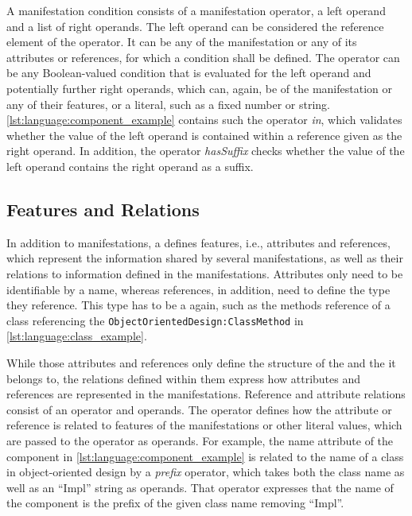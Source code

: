 A manifestation condition consists of a manifestation operator, a left operand and a list of right operands.
The left operand can be considered the reference element of the operator. 
It can be any \metaclass of the manifestation or any of its attributes or references, for which a condition shall be defined.
The operator can be any Boolean-valued condition that is evaluated for the left operand and potentially further right operands, which can, again, be \metaclasses of the manifestation or any of their features, or a literal, such as a fixed number or string.
\autoref{lst:language:component_example} contains such the operator \emph{in}, which validates whether the value of the left operand is contained within a reference given as the right operand.
In addition, the operator \emph{hasSuffix} checks whether the value of the left operand contains the right operand as a suffix.


\subsection{Features and Relations}

In addition to manifestations, a \commonality defines features, i.e., attributes and references, which represent the information shared by several manifestations, as well as their relations to information defined in the manifestations.
Attributes only need to be identifiable by a name, whereas references, in addition, need to define the type they reference.
This type has to be a \commonality again, such as the methods reference of a class referencing the \commonality \texttt{ObjectOrientedDesign:ClassMethod} in \autoref{lst:language:class_example}.

While those attributes and references only define the structure of the \commonality and the \conceptmetamodel it belongs to, the relations defined within them express how attributes and references are represented in the manifestations.
Reference and attribute relations consist of an operator and operands.
The operator defines how the \commonality attribute or reference is related to features of the manifestations or other literal values, which are passed to the operator as operands.
For example, the name attribute of the component \commonality in \autoref{lst:language:component_example} is related to the name of a class in object-oriented design by a \emph{prefix} operator, which takes both the class name as well as an \enquote{Impl} string as operands.
That operator expresses that the name of the component \commonality is the prefix of the given class name removing \enquote{Impl}.

